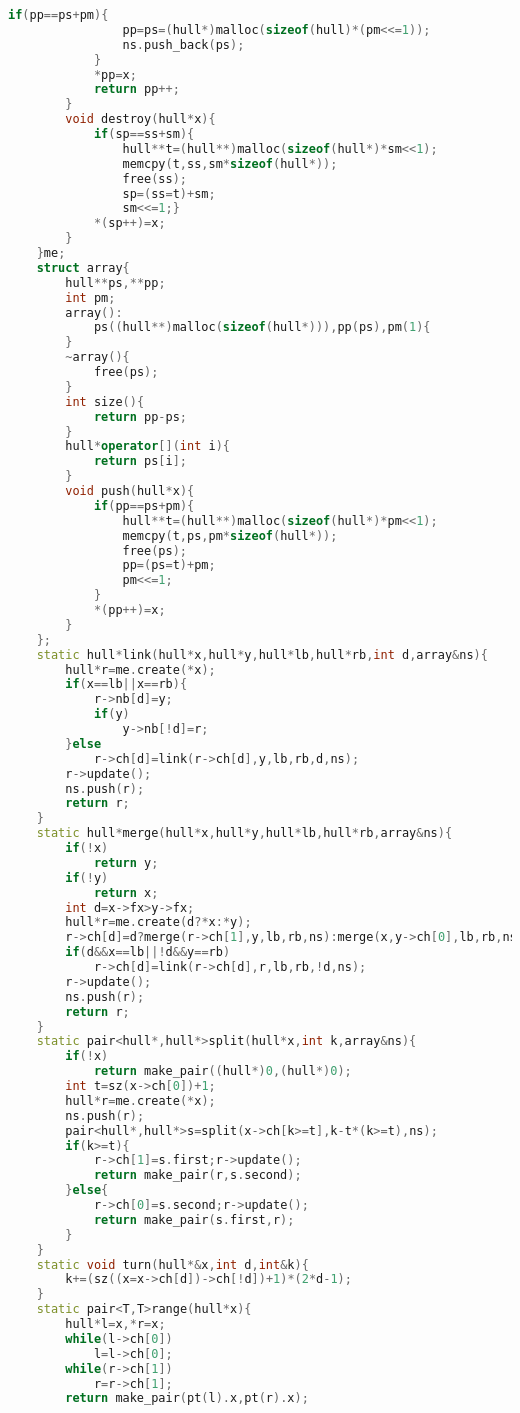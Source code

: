 \documentclass{book}
\begin{document}
\begin{lstlisting}[language=C++,title={Dynamic Convex Hull (Treap).hpp (9485 bytes, 327 lines)}]
            if(pp==ps+pm){
                pp=ps=(hull*)malloc(sizeof(hull)*(pm<<=1));
                ns.push_back(ps);
            }
            *pp=x;
            return pp++;
        }
        void destroy(hull*x){
            if(sp==ss+sm){
                hull**t=(hull**)malloc(sizeof(hull*)*sm<<1);
                memcpy(t,ss,sm*sizeof(hull*));
                free(ss);
                sp=(ss=t)+sm;
                sm<<=1;}
            *(sp++)=x;
        }
    }me;
    struct array{
        hull**ps,**pp;
        int pm;
        array():
            ps((hull**)malloc(sizeof(hull*))),pp(ps),pm(1){
        }
        ~array(){
            free(ps);
        }
        int size(){
            return pp-ps;
        }
        hull*operator[](int i){
            return ps[i];
        }
        void push(hull*x){
            if(pp==ps+pm){
                hull**t=(hull**)malloc(sizeof(hull*)*pm<<1);
                memcpy(t,ps,pm*sizeof(hull*));
                free(ps);
                pp=(ps=t)+pm;
                pm<<=1;
            }
            *(pp++)=x;
        }
    };
    static hull*link(hull*x,hull*y,hull*lb,hull*rb,int d,array&ns){
        hull*r=me.create(*x);
        if(x==lb||x==rb){
            r->nb[d]=y;
            if(y)
                y->nb[!d]=r;
        }else
            r->ch[d]=link(r->ch[d],y,lb,rb,d,ns);
        r->update();
        ns.push(r);
        return r;
    }
    static hull*merge(hull*x,hull*y,hull*lb,hull*rb,array&ns){
        if(!x)
            return y;
        if(!y)
            return x;
        int d=x->fx>y->fx;
        hull*r=me.create(d?*x:*y);
        r->ch[d]=d?merge(r->ch[1],y,lb,rb,ns):merge(x,y->ch[0],lb,rb,ns);
        if(d&&x==lb||!d&&y==rb)
            r->ch[d]=link(r->ch[d],r,lb,rb,!d,ns);
        r->update();
        ns.push(r);
        return r;
    }
    static pair<hull*,hull*>split(hull*x,int k,array&ns){
        if(!x)
            return make_pair((hull*)0,(hull*)0);
        int t=sz(x->ch[0])+1;
        hull*r=me.create(*x);
        ns.push(r);
        pair<hull*,hull*>s=split(x->ch[k>=t],k-t*(k>=t),ns);
        if(k>=t){
            r->ch[1]=s.first;r->update();
            return make_pair(r,s.second);
        }else{
            r->ch[0]=s.second;r->update();
            return make_pair(s.first,r);
        }
    }
    static void turn(hull*&x,int d,int&k){
        k+=(sz((x=x->ch[d])->ch[!d])+1)*(2*d-1);
    }
    static pair<T,T>range(hull*x){
        hull*l=x,*r=x;
        while(l->ch[0])
            l=l->ch[0];
        while(r->ch[1])
            r=r->ch[1];
        return make_pair(pt(l).x,pt(r).x);

\end{lstlisting}
\end{document}
